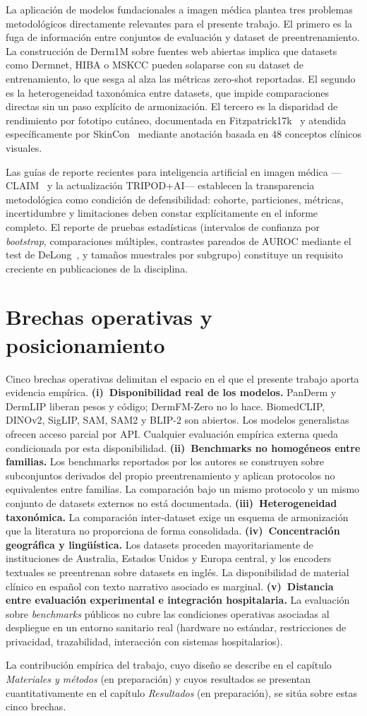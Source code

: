 La aplicación de modelos fundacionales a imagen médica plantea tres
problemas metodológicos directamente relevantes para el presente
trabajo. El primero es la fuga de información entre conjuntos de
evaluación y dataset de preentrenamiento. La construcción de Derm1M
sobre fuentes web abiertas implica que datasets como Dermnet, HIBA
o MSKCC pueden solaparse con su dataset de entrenamiento, lo que
sesga al alza las métricas zero-shot reportadas. El segundo es la
heterogeneidad taxonómica entre datasets, que impide comparaciones
directas sin un paso explícito de armonización. El tercero es la
disparidad de rendimiento por fototipo cutáneo, documentada en
Fitzpatrick17k~\cite{fitzpatrick17k} y atendida específicamente por
SkinCon~\cite{skincon} mediante anotación basada en $48$
conceptos clínicos visuales.

Las guías de reporte recientes para inteligencia artificial en
imagen médica ---CLAIM~\cite{claim2024} y la actualización
TRIPOD+AI--- establecen la transparencia metodológica como
condición de defensibilidad: cohorte, particiones, métricas,
incertidumbre y limitaciones deben constar explícitamente en el
informe completo. El reporte de pruebas estadísticas (intervalos de
confianza por \emph{bootstrap}, comparaciones múltiples,
contrastes pareados de AUROC mediante el test de
DeLong~\cite{delong1988}, y tamaños muestrales por subgrupo)
constituye un requisito creciente en publicaciones de la disciplina.

\section{Brechas operativas y posicionamiento}
\label{sec:brecha}

Cinco brechas operativas delimitan el espacio en el que el presente
trabajo aporta evidencia empírica. \textbf{(i)~Disponibilidad real
de los modelos.} PanDerm y DermLIP liberan pesos y código;
DermFM-Zero no lo hace. BiomedCLIP, DINOv2, SigLIP, SAM, SAM2 y
BLIP-2 son abiertos. Los modelos generalistas ofrecen acceso parcial
por API. Cualquier evaluación empírica externa queda condicionada
por esta disponibilidad. \textbf{(ii)~Benchmarks no homogéneos entre
familias.} Los benchmarks reportados por los autores se construyen
sobre subconjuntos derivados del propio preentrenamiento y aplican
protocolos no equivalentes entre familias. La comparación bajo un
mismo protocolo y un mismo conjunto de datasets externos no está
documentada. \textbf{(iii)~Heterogeneidad taxonómica.} La
comparación inter-dataset exige un esquema de armonización que la
literatura no proporciona de forma consolidada.
\textbf{(iv)~Concentración geográfica y lingüística.} Los datasets
proceden mayoritariamente de instituciones de Australia, Estados
Unidos y Europa central, y los encoders textuales se preentrenan
sobre datasets en inglés. La disponibilidad de material clínico en
español con texto narrativo asociado es marginal.
\textbf{(v)~Distancia entre evaluación experimental e integración
hospitalaria.} La evaluación sobre \emph{benchmarks} públicos no
cubre las condiciones operativas asociadas al despliegue en un
entorno sanitario real (hardware no estándar, restricciones de
privacidad, trazabilidad, interacción con sistemas hospitalarios).

La contribución empírica del trabajo, cuyo diseño se describe en el
capítulo \emph{Materiales y métodos} (en preparación) y cuyos resultados se presentan
cuantitativamente en el capítulo \emph{Resultados} (en preparación), se sitúa
sobre estas cinco brechas.
